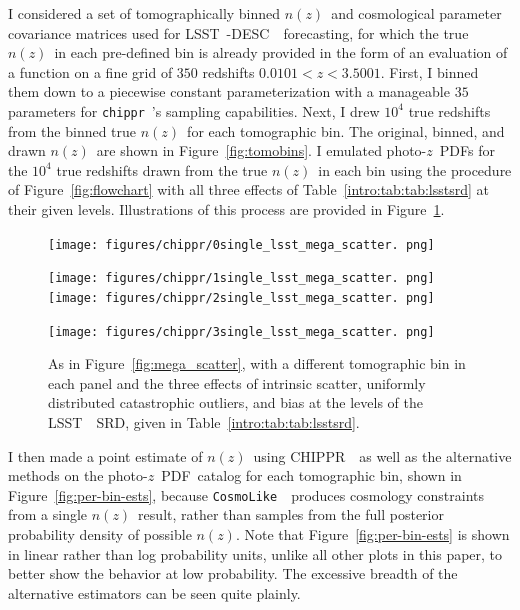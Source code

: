 \documentclass[iop]{emulateapj}
\newcommand{\Fig}[1]{Figure~\ref{#1}}
\newcommand{\project}[1]{{\textsc{#1}}~}
\newcommand{\lsst}{\project{LSST}}
\newcommand{\desc}{\lsst-\project{DESC}}
\newcommand{\Chippr}{\project{CHIPPR}}
\newcommand{\repo}[1]{{\texttt{#1}}~}
\newcommand{\chippr}{\repo{chippr}}
\newcommand{\cosmolike}{\repo{CosmoLike}}
\newcommand{\nz}{$n(z)$}
\newcommand{\pz}{photo-$z$~}
\newcommand{\pzpdf}{\pz PDF}
\begin{document}
I considered a set of tomographically binned \nz\ and cosmological parameter 
covariance matrices used for \desc\ forecasting, for which the true \nz\ in 
each pre-defined bin is already provided in the form of an evaluation of a 
function on a fine grid of $350$ redshifts $0.0101 < z < 3.5001$.
First, I binned them down to a piecewise constant parameterization with a 
manageable $35$ parameters for \chippr's sampling capabilities.
Next, I drew $10^{4}$ true redshifts from the binned true \nz\ for each 
tomographic bin.
The original, binned, and drawn \nz\ are shown in \Fig{fig:tomobins}.
I emulated \pzpdf s for the $10^{4}$ true redshifts drawn from the true \nz\ in 
each bin using the procedure of \Fig{fig:flowchart} with all three effects of 
Table~\ref{intro:tab:tab:lsstsrd} at their given levels.
Illustrations of this process are provided in \Fig{fig:per-bin-scatter}.

\begin{figure}
	\begin{center}
		
\texttt{[image: figures/chippr/0single\_lsst\_mega\_scatter.
png]}
		
\texttt{[image: figures/chippr/1single\_lsst\_mega\_scatter.
png]}		
\texttt{[image: figures/chippr/2single\_lsst\_mega\_scatter.
png]}
		
\texttt{[image: figures/chippr/3single\_lsst\_mega\_scatter.
png]}
		\caption{As in \Fig{fig:mega_scatter}, with a different 
tomographic bin in each panel and the three effects of intrinsic scatter, 
uniformly distributed catastrophic outliers, and bias at the levels of the 
\lsst\ SRD, given in Table~\ref{intro:tab:tab:lsstsrd}.
		}
		\label{fig:per-bin-scatter}
	\end{center}
\end{figure}

I then made a point estimate of \nz\ using \Chippr\ as well as the alternative 
methods on the \pzpdf\ catalog for each tomographic bin, shown in 
\Fig{fig:per-bin-ests}, because \cosmolike\ produces cosmology constraints from 
a single \nz\ result, rather than samples from the full posterior probability 
density of possible \nz.
Note that \Fig{fig:per-bin-ests} is shown in linear rather than log probability 
units, unlike all other plots in this paper, to better show the behavior at low 
probability.
The excessive breadth of the alternative estimators can be seen quite plainly.
\end{document}
